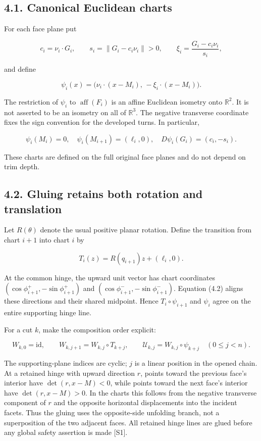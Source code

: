 \documentclass[
  11pt,
  letterpaper,
]{article}
\begin{document}
\subsection{4.1. Canonical Euclidean
charts}\label{canonical-euclidean-charts}

For each face plane put

\[
c_i=\nu_i\cdot G_i,\qquad
s_i=\|G_i-c_i\nu_i\|>0,\qquad
\xi_i=\frac{G_i-c_i\nu_i}{s_i},
\]

and define

\[
\psi_i(x)=\bigl(\nu_i\cdot(x-M_i),\,-\xi_i\cdot(x-M_i)\bigr).
\tag{4.1}
\]

The restriction of \(\psi_i\) to \(\operatorname{aff}(F_i)\) is an
affine Euclidean isometry onto \(\mathbb R^2\). It is not asserted to be
an isometry on all of \(\mathbb R^3\). The negative transverse
coordinate fixes the sign convention for the developed turns. In
particular,

\[
\psi_i(M_i)=0,\quad
\psi_i(M_{i+1})=(\ell_i,0),\quad
D\psi_i(G_i)=(c_i,-s_i).
\]

These charts are defined on the full original face planes and do not
depend on trim depth.

\subsection{4.2. Gluing retains both rotation and
translation}\label{gluing-retains-both-rotation-and-translation}

Let \(R(\theta)\) denote the usual positive planar rotation. Define the
transition from chart \(i+1\) into chart \(i\) by

\[
T_i(z)=R(q_{i+1})z+(\ell_i,0).
\tag{4.2}
\]

At the common hinge, the upward unit vector has chart coordinates
\((\cos\phi_{i+1}^+,-\sin\phi_{i+1}^+)\) and
\((\cos\phi_{i+1}^-,-\sin\phi_{i+1}^-)\). Equation (4.2) aligns these
directions and their shared midpoint. Hence \(T_i\circ\psi_{i+1}\) and
\(\psi_i\) agree on the entire supporting hinge line.

For a cut \(k\), make the composition order explicit:

\[
W_{k,0}=\mathrm{id},\qquad
W_{k,j+1}=W_{k,j}\circ T_{k+j},\qquad
\mathcal U_{k,j}=W_{k,j}\circ\psi_{k+j}
\quad(0\le j<n).
\]

The supporting-plane indices are cyclic; \(j\) is a linear position in
the opened chain. At a retained hinge with upward direction \(r\),
points toward the previous face's interior have \(\det(r,x-M)<0\), while
points toward the next face's interior have \(\det(r,x-M)>0\). In the
charts this follows from the negative transverse component of \(r\) and
the opposite horizontal displacements into the incident facets. Thus the
gluing uses the opposite-side unfolding branch, not a superposition of
the two adjacent faces. All retained hinge lines are glued before any
global safety assertion is made {[}S1{]}.
\end{document}
